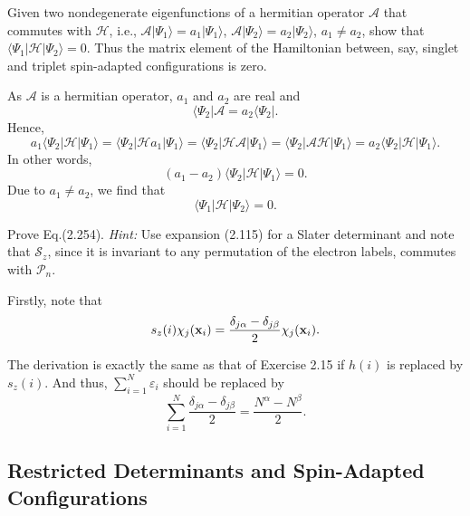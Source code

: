\documentclass[a4paper]{book}
\newcounter{exercise}[chapter]
\newcounter{solution}[chapter]
\newcommand{\bfx}{{\bf x}}
\begin{document}
	\begin{exercise}
	Given two nondegenerate eigenfunctions of a hermitian operator $\mathscr{A}$ that commutes with $\mathscr{H}$, i.e., $\mathscr{A} | \Psi_1 \rangle = a_1 | \Psi_1 \rangle$, $\mathscr{A} | \Psi_2 \rangle = a_2 | \Psi_2 \rangle$, $a_1 \neq a_2$, show that $\langle \Psi_1 | \mathscr{H} | \Psi_2 \rangle = 0$. Thus the matrix element of the Hamiltonian between, say, singlet and triplet spin-adapted configurations is zero.
	\end{exercise}
	
	\begin{solution}
	
	As $\mathscr{A}$ is a hermitian operator, $a_1$ and $a_2$ are real and
	\[
		\langle \Psi_2 | \mathscr{A} = a_2 \langle \Psi_2 |.
	\]
	Hence, 
	\[
		a_1 \langle \Psi_2 | \mathscr{H} | \Psi_1 \rangle = \langle \Psi_2 | \mathscr{H} a_1 | \Psi_1 \rangle = \langle \Psi_2 | \mathscr{H} \mathscr{A} | \Psi_1 \rangle = \langle \Psi_2 | \mathscr{A} \mathscr{H} | \Psi_1 \rangle = a_2 \langle \Psi_2 | \mathscr{H} | \Psi_1 \rangle .
	\]
	In other words,
	\[
		( a_1 - a_2 ) \langle \Psi_2 | \mathscr{H} | \Psi_1 \rangle = 0 .
	\]
	Due to $a_1 \neq a_2$, we find that
	\[
		\langle \Psi_1 | \mathscr{H} | \Psi_2 \rangle = 0 .
	\]

	\end{solution}
	
	\begin{exercise}
	Prove Eq.(2.254). {\it Hint:} Use expansion (2.115) for a Slater determinant and note that $\mathscr{S}_z$, since it is invariant to any permutation of the electron labels, commutes with $\mathscr{P}_n$.
	\end{exercise}
	
	\begin{solution}
	
	Firstly, note that
	\begin{align*}
		s_z(i) \chi_j( \bfx_i ) = \frac{ \delta_{j\alpha} - \delta_{j\beta} }{2} \chi_j( \bfx_i ) .
	\end{align*}
	
	The derivation is exactly the same as that of Exercise 2.15 if $h(i)$ is replaced by $s_z(i)$. And thus, $\sum_{ i=1 }^N \varepsilon_i$ should be replaced by
	\[
		\sum_{ i=1 }^N \frac{ \delta_{j\alpha} - \delta_{j\beta} }{2} = \frac{ N^\alpha - N^\beta }{2} .
	\]
	
	\end{solution}
	
	\subsection{Restricted Determinants and Spin-Adapted Configurations}
	
\end{document}
